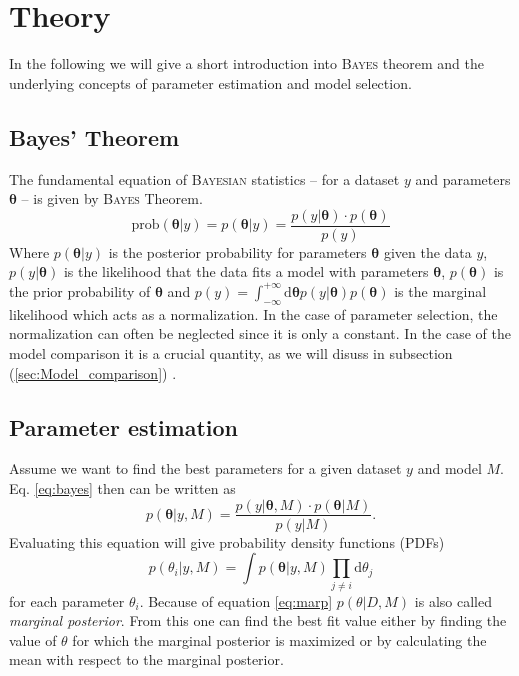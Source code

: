 \documentclass[%
 reprint,
 amsmath,amssymb,
 aps,
]{revtex4-1}
\begin{document}
\section{Theory}
\noindent In the following we will give a short introduction into \textsc{Bayes} theorem and the underlying concepts of parameter estimation and model selection.
\subsection{Bayes' Theorem}
\noindent The fundamental equation of \textsc{Bayesian} statistics -- for a dataset $y$ and parameters $\boldsymbol{\theta}$ -- is given by \textsc{Bayes} Theorem.
\begin{equation}
\label{eq:bayes}
\text{prob}(\boldsymbol{\theta} | y) =	p(\boldsymbol{\theta} | y) = \frac{p(y|\boldsymbol{\theta})\cdot p(\boldsymbol{\theta})}{p(y)} 
\end{equation}
Where $p(\boldsymbol{\theta} | y) $ is the posterior probability for parameters $\boldsymbol{\theta}$ given the data $y$, $p(y|\boldsymbol{\theta})$ is the likelihood that the data fits a model with parameters $\boldsymbol{\theta}$, $p(\boldsymbol{\theta})$ is the prior probability of $\boldsymbol{\theta}$ and $p(y)= \int_{-\infty}^{+\infty}\text{d}\boldsymbol{\theta} p(y|\boldsymbol{\theta})p(\boldsymbol{\theta})$ is the marginal likelihood which acts as a normalization.  In the case of parameter selection, the normalization can often be neglected since it is only a  constant. In the case of the model comparison it is a crucial quantity, as we will disuss in subsection (\ref{sec:Model_comparison}) \cite[Chap. 2]{sivia}. 

\subsection{Parameter estimation}
\noindent Assume we want to find the best parameters for a given dataset $y$ and model $M$. Eq. \eqref{eq:bayes} then can be written as
\begin{equation}\label{eq:PDF}
	p(\boldsymbol{\theta} | y,M) = \frac{p(y|\boldsymbol{\theta},M)\cdot p(\boldsymbol{\theta}|M)}{p(y|M)}.
\end{equation}
Evaluating this equation will give probability density functions (PDFs) 
\begin{equation}
\label{eq:marp}
	p(\theta_i|y,M)=\int p(\boldsymbol{\theta}|y,M)\prod_{j\neq i}\text{d}{\theta_j}
\end{equation}
 for each parameter $\theta_i$.  Because of equation \eqref{eq:marp} $p(\theta|D,M)$ is also called \emph{marginal posterior}. From this one can find the best fit value either by finding the value of $\theta$ for which the marginal posterior is maximized or by calculating the mean with respect to the marginal posterior.
\end{document}

